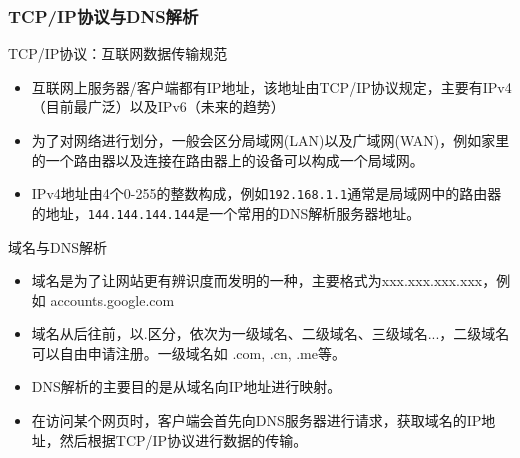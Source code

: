 \documentclass[9pt]{beamer}
\begin{document}
\begin{frame}
    \frametitle{TCP/IP协议与DNS解析}

    \begin{block}{TCP/IP协议：互联网数据传输规范}
        \begin{itemize}
            \item 互联网上服务器/客户端都有IP地址，该地址由TCP/IP协议规定，主要有IPv4（目前最广泛）以及IPv6（未来的趋势）
            \item 为了对网络进行划分，一般会区分局域网(LAN)以及广域网(WAN)，例如家里的一个路由器以及连接在路由器上的设备可以构成一个局域网。
            \item IPv4地址由4个0-255的整数构成，例如\texttt{192.168.1.1}通常是局域网中的路由器的地址，\texttt{144.144.144.144}是一个常用的DNS解析服务器地址。
        \end{itemize}
    \end{block}
    
    \begin{block}{域名与DNS解析}
\begin{itemize}
    \item 域名是为了让网站更有辨识度而发明的一种，主要格式为xxx.xxx.xxx.xxx，例如 accounts.google.com
    \item 域名从后往前，以.区分，依次为一级域名、二级域名、三级域名...，二级域名可以自由申请注册。一级域名如 .com, .cn, .me等。
    \item DNS解析的主要目的是从域名向IP地址进行映射。
    \item 在访问某个网页时，客户端会首先向DNS服务器进行请求，获取域名的IP地址，然后根据TCP/IP协议进行数据的传输。
\end{itemize}
    \end{block}



\end{frame}
\end{document}
